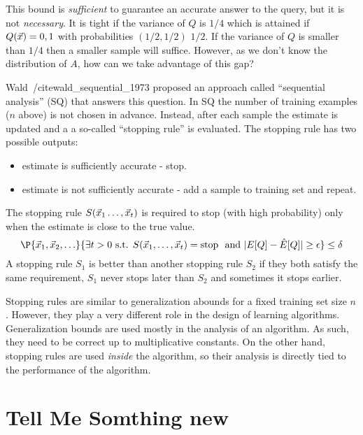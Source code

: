 This bound is {\em sufficient} to guarantee an accurate answer to the
query, but it is not {\em necessary}. It is tight if the variance of
$Q$ is $1/4$ which is attained if $Q(\vec{x})=0,1$ with probabilities
$(1/2,1/2)$ $1/2$. If the variance of $Q$ is smaller than $1/4$ then a
smaller sample will suffice. However, as we don't know the
distribution of $A$, how can we take advantage of this gap?

Wald~/cite{wald_sequential_1973} proposed an approach called
``sequential analysis'' (SQ) that answers this question.  In SQ the
number of training examples ($n$ above) is not chosen in
advance. Instead, after each sample the estimate is updated and a
a so-called ``stopping rule'' is evaluated. The stopping rule has
two possible outputs:
\begin{itemize}
\item estimate is sufficiently accurate - stop.
\item estimate is not sufficiently accurate - add a sample to
  training set and repeat.
\end{itemize}
The stopping rule $S(\vec{x}_1\ldots,\vec{x}_t)$ is required to stop (with
high probability) only when the estimate is close to the true value.
\[
\P{\vx_1,\vx_2,\ldots}{\exists t>0 \mbox{ s.t. } S(\vx_1,\ldots,\vx_t)
  = \mbox{stop }\mbox{ and } |E[Q] -\hat{E}[Q]| \geq \epsilon} \leq \delta
\]
A stopping rule $S_1$ is better than another stopping rule $S_2$ if
they both satisfy the same requirement, $S_1$ never stops later than
$S_2$ and sometimes it stops earlier.

Stopping rules are similar to generalization abounds for a fixed
training set size $n$. However, they play a very different role in the
design of learning algorithms. Generalization bounds are used mostly
in the analysis of an algorithm. As such, they need to be correct up
to multiplicative constants. On the other hand, stopping rules are
used {\em inside} the algorithm, so their analysis is directly tied to
the performance of the algorithm.

\section{Tell Me Somthing new}
